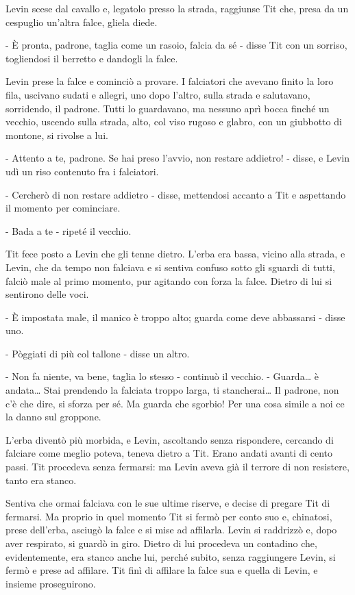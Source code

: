 Levin scese dal cavallo e, legatolo presso la strada, raggiunse Tit che, presa da un cespuglio un'altra falce, gliela diede. 

- È pronta, padrone, taglia come un rasoio, falcia da sé - disse Tit con un sorriso, togliendosi il berretto e dandogli la falce. 

Levin prese la falce e cominciò a provare. I falciatori che avevano finito la loro fila, uscivano sudati e allegri, uno dopo l'altro, sulla strada e salutavano, sorridendo, il padrone. Tutti lo guardavano, ma nessuno aprì bocca finché un vecchio, uscendo sulla strada, alto, col viso rugoso e glabro, con un giubbotto di montone, si rivolse a lui. 

- Attento a te, padrone. Se hai preso l'avvio, non restare addietro! - disse, e Levin udì un riso contenuto fra i falciatori. 

- Cercherò di non restare addietro - disse, mettendosi accanto a Tit e aspettando il momento per cominciare. 

- Bada a te - ripeté il vecchio. 

Tit fece posto a Levin che gli tenne dietro. L'erba era bassa, vicino alla strada, e Levin, che da tempo non falciava e si sentiva confuso sotto gli sguardi di tutti, falciò male al primo momento, pur agitando con forza la falce. Dietro di lui si sentirono delle voci. 

- È impostata male, il manico è troppo alto; guarda come deve abbassarsi - disse uno. 

- Pòggiati di più col tallone - disse un altro. 

- Non fa niente, va bene, taglia lo stesso - continuò il vecchio. - Guarda\ldots{} è andata\ldots{} Stai prendendo la falciata troppo larga, ti stancherai\ldots{} Il padrone, non c'è che dire, si sforza per sé. Ma guarda che sgorbio! Per una cosa simile a noi ce la danno sul groppone. 

L'erba diventò più morbida, e Levin, ascoltando senza rispondere, cercando di falciare come meglio poteva, teneva dietro a Tit. Erano andati avanti di cento passi. Tit procedeva senza fermarsi: ma Levin aveva già il terrore di non resistere, tanto era stanco. 

Sentiva che ormai falciava con le sue ultime riserve, e decise di pregare Tit di fermarsi. Ma proprio in quel momento Tit si fermò per conto suo e, chinatosi, prese dell'erba, asciugò la falce e si mise ad affilarla. Levin si raddrizzò e, dopo aver respirato, si guardò in giro. Dietro di lui procedeva un contadino che, evidentemente, era stanco anche lui, perché subito, senza raggiungere Levin, si fermò e prese ad affilare. Tit finì di affilare la falce sua e quella di Levin, e insieme proseguirono. 

